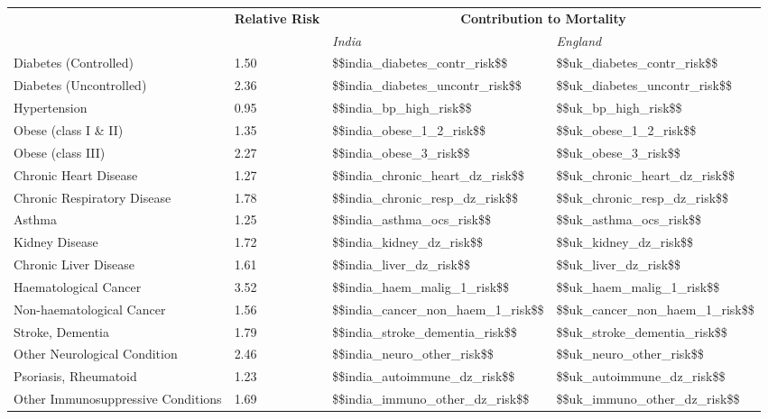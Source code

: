 \begin{tabular}{p{6cm}p{1.5cm}p{2cm}p{2cm}}
& \textbf{Relative \newline Risk} & \multicolumn{2}{c}{\textbf{Contribution to Mortality}} \\[-1.5ex]
& & \emph{India} & \emph{England} \\[2ex]
Diabetes (Controlled) & \num{1.50} & \num{$$india_diabetes_contr_risk$$} & \num{$$uk_diabetes_contr_risk$$} \\[0.25ex]
Diabetes (Uncontrolled) & \num{2.36} & \num{$$india_diabetes_uncontr_risk$$} & \num{$$uk_diabetes_uncontr_risk$$} \\[0.25ex]
Hypertension & \num{0.95} & \num{$$india_bp_high_risk$$} & \num{$$uk_bp_high_risk$$} \\[0.25ex]
Obese (class I \& II) & \num{1.35} & \num{$$india_obese_1_2_risk$$} & \num{$$uk_obese_1_2_risk$$} \\[0.25ex]
Obese (class III) & \num{2.27} & \num{$$india_obese_3_risk$$} & \num{$$uk_obese_3_risk$$} \\[0.25ex]
Chronic Heart Disease & \num{1.27} & \num{$$india_chronic_heart_dz_risk$$} & \num{$$uk_chronic_heart_dz_risk$$} \\[0.25ex]
Chronic Respiratory Disease & \num{1.78} & \num{$$india_chronic_resp_dz_risk$$} & \num{$$uk_chronic_resp_dz_risk$$} \\[0.25ex]
Asthma & \num{1.25} & \num{$$india_asthma_ocs_risk$$} & \num{$$uk_asthma_ocs_risk$$} \\[0.25ex]
Kidney Disease & \num{1.72} & \num{$$india_kidney_dz_risk$$} & \num{$$uk_kidney_dz_risk$$} \\[0.25ex]
Chronic Liver Disease & \num{1.61} & \num{$$india_liver_dz_risk$$} & \num{$$uk_liver_dz_risk$$} \\[0.25ex]
Haematological Cancer & \num{3.52} & \num{$$india_haem_malig_1_risk$$} & \num{$$uk_haem_malig_1_risk$$} \\[0.25ex]
Non-haematological Cancer & \num{1.56} & \num{$$india_cancer_non_haem_1_risk$$} & \num{$$uk_cancer_non_haem_1_risk$$} \\[0.25ex]
Stroke, Dementia & \num{1.79} & \num{$$india_stroke_dementia_risk$$} & \num{$$uk_stroke_dementia_risk$$} \\[0.25ex]
Other Neurological Condition & \num{2.46} & \num{$$india_neuro_other_risk$$} & \num{$$uk_neuro_other_risk$$} \\[0.25ex]
Psoriasis, Rheumatoid & \num{1.23} & \num{$$india_autoimmune_dz_risk$$} & \num{$$uk_autoimmune_dz_risk$$} \\[0.25ex]
Other Immunosuppressive Conditions & \num{1.69} & \num{$$india_immuno_other_dz_risk$$} & \num{$$uk_immuno_other_dz_risk$$} \\[0.25ex]
\end{tabular}


